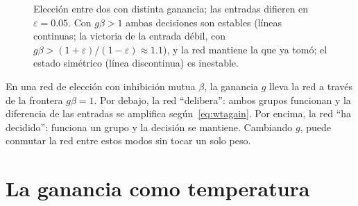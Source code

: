 \begin{figure}[t]
\centering
{}
\caption{Elección entre dos con distinta ganancia; las entradas difieren en $\varepsilon=0.05$. Con $g\beta>1$ ambas decisiones son estables (líneas continuas; la victoria de la entrada débil, con $g\beta>(1+\varepsilon)/(1-\varepsilon)\approx1.1$), y la red mantiene la que ya tomó; el estado simétrico (línea discontinua) es inestable.}
\label{fig:pitchfork}
\end{figure}

\begin{keyblock}
\begin{proposition}
\label{prop:gainwta}
En una red de elección con inhibición mutua $\beta$, la ganancia $g$ lleva la red a través de la frontera $g\beta=1$. Por debajo, la red “delibera”: ambos grupos funcionan y la diferencia de las entradas se amplifica según~\eqref{eq:wtagain}. Por encima, la red “ha decidido”: funciona un grupo y la decisión se mantiene. Cambiando $g$,  puede conmutar la red entre estos modos sin tocar un solo peso.
\end{proposition}
\end{keyblock}

\section{La ganancia como temperatura}


